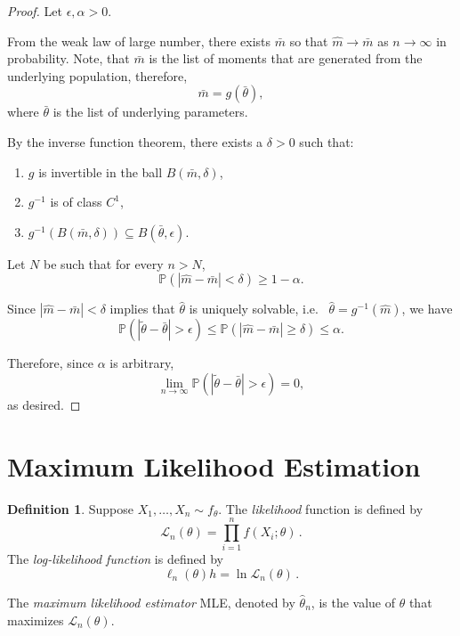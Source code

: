 \documentclass[
  openany]{book}
\theoremstyle{definition}
\newtheorem{definition}{Definition}[chapter]
\theoremstyle{definition}
\theoremstyle{definition}
\theoremstyle{definition}
\theoremstyle{remark}
\begin{document}
\begin{proof}
Let \(\epsilon, \alpha >0\).

From the weak law of large number, there exists \(\bar m\) so that \(\hat m \to \bar m\)
as \(n \to \infty\) in probability.
Note, that \(\bar m\) is the list of moments that are generated from the underlying
population, therefore,
\[\bar m = g (\bar \theta),\]
where \(\bar\theta\) is the list of underlying parameters.

By the inverse function theorem, there exists a \(\delta >0\) such that:

\begin{enumerate}
\def\labelenumi{\arabic{enumi}.}
\item
  \(g\) is invertible in the ball \(B(\bar m, \delta)\),
\item
  \(g^{-1}\) is of class \(C^1\),
\item
  \(g^{-1}(B(\bar m, \delta)) \subseteq B(\bar \theta, \epsilon)\).
\end{enumerate}

Let \(N\) be such that for every \(n > N\),
\[\mathbb{P}( |\hat m - \bar m| < \delta) \geq 1 - \alpha. \]

Since \(|\hat m - \bar m| < \delta\) implies that \(\hat\theta\) is uniquely solvable, i.e.~
\(\hat\theta = g^{-1}(\hat m)\),
we have
\[ \mathbb{P}(| \tilde \theta - \bar \theta | > \epsilon) \leq \mathbb{P}( |\hat m - \bar m| \geq \delta) \leq \alpha. \]

Therefore, since \(\alpha\) is arbitrary,
\[\lim_{n\to \infty}\mathbb{P}( |\tilde \theta - \bar \theta| > \epsilon ) = 0,\]
as desired.
\end{proof}

\hypertarget{maximum-likelihood-estimation}{%
\section{Maximum Likelihood Estimation}\label{maximum-likelihood-estimation}}

\begin{definition}
Suppose \(X_1, \dots, X_n \sim f_\theta\).
The \emph{likelihood} function is defined by
\[ \mathcal{L}_n(\theta) = \prod_{i = 1}^n f (X_i; \theta) \,. \]
The \emph{log-likelihood function} is defined by
\[ \ell_n (\theta) h = \ln \mathcal{L}_n (\theta) \,. \]

The \emph{maximum likelihood estimator} MLE, denoted by \(\hat \theta_n\), is the value of
\(\theta\) that maximizes \(\mathcal{L}_n(\theta)\).
\end{definition}
\end{document}
